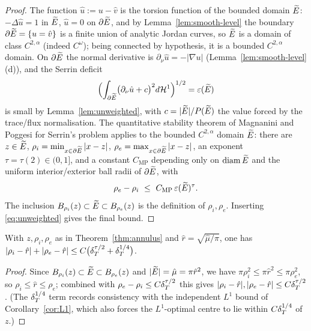 \begin{proof}
The function $\hat u:=u-\hat v$ is the torsion function of the bounded
domain $\widetilde E$: $-\Delta\hat u=1$ in $\widetilde E$, $\hat u=0$ on
$\partial\widetilde E$, and by Lemma~\ref{lem:smooth-level} the boundary
$\partial\widetilde E=\{u=\hat v\}$ is a finite union of analytic Jordan curves,
so $\widetilde E$ is a domain of class $C^{2,\alpha}$ (indeed $C^\omega$); being
connected by hypothesis, it is a bounded $C^{2,\alpha}$ domain. On
$\partial\widetilde E$ the normal derivative is $\partial_\nu\hat u=-|\nabla u|$
(Lemma~\ref{lem:smooth-level}(d)), and the Serrin deficit
\[
   \Bigl(\int_{\partial\widetilde E}\bigl(\partial_\nu\hat u+c\bigr)^2
   d\mathcal{H}^1\Bigr)^{1/2}=\varepsilon(\widetilde E)
\]
is small by Lemma~\ref{lem:unweighted}, with $c=|\widetilde E|/P(\widetilde E)$ the value
forced by the trace/flux normalisation. The quantitative stability theorem
of Magnanini and Poggesi for Serrin's problem
\cite[Theorem~1.2 and \S4]{MagnaniniPoggesi2019} applies to the bounded
$C^{2,\alpha}$ domain $\widetilde E$: there are $z\in\widetilde E$,
$\rho_i=\min_{x\in\partial\widetilde E}|x-z|$,
$\rho_e=\max_{x\in\partial\widetilde E}|x-z|$, an exponent $\tau=\tau(2)\in(0,1]$,
and a constant $C_{\mathrm{MP}}$ depending only on $\operatorname{diam}
\widetilde E$ and the uniform interior/exterior ball radii of $\partial\widetilde E$,
with
\[
   \rho_e-\rho_i\ \le\ C_{\mathrm{MP}}\,\eps(\Etil)^{\tau}.
\]
The inclusion $B_{\rho_i}(z)\subset\widetilde E\subset B_{\rho_e}(z)$ is the
definition of $\rho_i,\rho_e$. Inserting \eqref{eq:unweighted} gives the
final bound.
\end{proof}

\begin{corollary}\label{cor:radii}
With $z,\rho_i,\rho_e$ as in Theorem~\ref{thm:annulus} and
$\hat r=\sqrt{\hat\mu/\pi}$, one has
$|\rho_i-\hat r|+|\rho_e-\hat r|\le C\bigl(\delta_T^{\tau/2}+\delta_T^{1/4}\bigr)$.
\end{corollary}

\begin{proof}
Since $B_{\rho_i}(z)\subset\widetilde E\subset B_{\rho_e}(z)$ and
$|\widetilde E|=\hat\mu=\pi\hat r^2$, we have $\pi\rho_i^2\le\pi\hat r^2\le
\pi\rho_e^2$, so $\rho_i\le\hat r\le\rho_e$; combined with $\rho_e-\rho_i\le
C\delta_T^{\tau/2}$ this gives $|\rho_i-\hat r|,|\rho_e-\hat r|\le
C\delta_T^{\tau/2}$. (The $\delta_T^{1/4}$ term records consistency with the
independent $L^1$ bound of Corollary~\ref{cor:L1}, which also forces the
$L^1$-optimal centre to lie within $C\delta_T^{1/4}$ of $z$.)
\end{proof}

